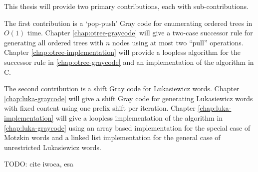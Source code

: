 This thesis will provide two primary contributions, each with sub-contributions.  

The first contribution is a `pop-push' Gray code for enumerating ordered trees in $O(1)$ time. Chapter \ref{chap:otree-graycode} will give a two-case successor rule for generating all ordered trees with $n$ nodes using at most two ``pull'' operations. Chapter \ref{chap:otree-implementation} will provide a loopless algorithm for the successor rule in \ref{chap:otree-graycode} and an implementation of the algorithm in C.

The second contribution is a shift Gray code for Lukasiewicz words.  Chapter \ref{chap:luka-graycode} will give a shift Gray code for generating Lukasiewicz words with fixed content using one prefix shift per iteration.  Chapter \ref{chap:luka-implementation} will give a loopless implementation of the algorithm in \ref{chap:luka-graycode} using an array based implementation for the special case of Motzkin words and a linked list implementation for the general case of unrestricted Lukasiewicz words.

TODO: cite iwoca, esa
